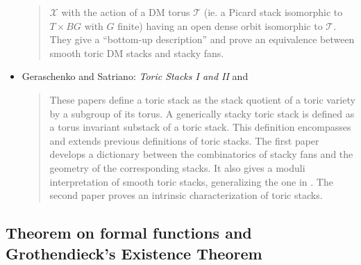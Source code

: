 \begin{itemize}
\begin{quote}
$\mathcal{X}$ with the action of a DM torus $\mathcal{T}$ (ie. a Picard
stack isomorphic to $T \times BG$ with $G$ finite) having an open dense
orbit isomorphic to $\mathcal{T}$. They give a ``bottom-up description''
and prove an equivalence between smooth toric DM stacks and stacky fans.
\end{quote}
\item Geraschenko and Satriano: \emph{Toric Stacks I and II}
\cite{gs_toric1} and \cite{gs_toric2}
\begin{quote}
These papers define a toric stack as the stack quotient of a toric
variety by a subgroup of its torus. A generically stacky toric stack
is defined as a torus invariant substack of a toric stack. This definition
encompasses and extends previous definitions of toric stacks. The first
paper develops a dictionary between the combinatorics of stacky fans
and the geometry of the corresponding stacks. It also gives a moduli
interpretation of smooth toric stacks, generalizing the one in \cite{perroni}.
The second paper proves an intrinsic characterization of toric stacks.
\end{quote}
\end{itemize}



\subsection{Theorem on formal functions and Grothendieck's Existence Theorem}
\label{subsection-theorem-formal-functions}


